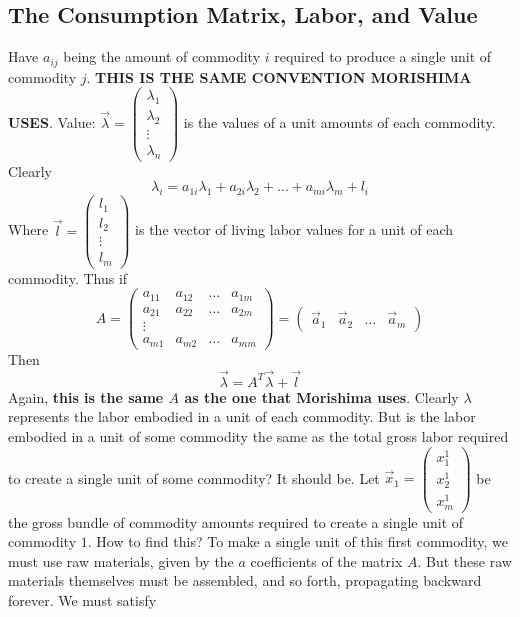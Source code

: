 \documentclass{article}
\theoremstyle{definition}
\theoremstyle{plain}
\theoremstyle{theorem}
\begin{document}
\subsection{The Consumption Matrix, Labor, and Value}
	Have $a_{ij}$ being the amount of commodity $i$ required to produce a single unit of commodity $j$. \textbf{THIS IS THE SAME CONVENTION MORISHIMA USES}. Value: $\vec{\lambda} = \begin{pmatrix} \lambda_1 \\ \lambda_2 \\ \vdots \\ \lambda_n \end{pmatrix}$ is the values of a unit amounts of each commodity. Clearly 
	\[ \lambda_i = a_{1i}\lambda_1 + a_{2i}\lambda_2 + \ldots + a_{mi}\lambda_m + l_i \]
Where $\vec{l} = \begin{pmatrix} l_1 \\ l_2 \\ \vdots \\ l_m \end{pmatrix}$ is the vector of living labor values for a unit of each commodity. Thus if 
\[ A = \begin{pmatrix} a_{11} & a_{12} & \ldots & a_{1m} \\
						a_{21} & a_{22} & \ldots & a_{2m} \\
						\vdots \\
						a_{m1} & a_{m2} & \ldots & a_{mm}  \end{pmatrix}
						= \begin{pmatrix} \vec{a}_1 & \vec{a}_2 & \ldots & \vec{a}_m \end{pmatrix} \]
Then 
\[ \vec{\lambda} = A^T\vec{\lambda} + \vec{l} \]
Again, \textbf{this is the same $A$ as the one that Morishima uses}. Clearly $\lambda$ represents the labor embodied in a unit of each commodity. But is the labor embodied in a unit of some commodity the same as the total gross labor required to create a single unit of some commodity? It should be. Let $\vec{x}_1 = \begin{pmatrix} x^1_1 \\ x^1_2 \\ x^1_m \end{pmatrix}$ be the gross bundle of commodity amounts required to create a single unit of commodity $1$. How to find this? To make a single unit of this first commodity, we must use raw materials, given by the $a$ coefficients of the matrix $A$. But these raw materials themselves must be assembled, and so forth, propagating backward forever. We must satisfy
\end{document}
